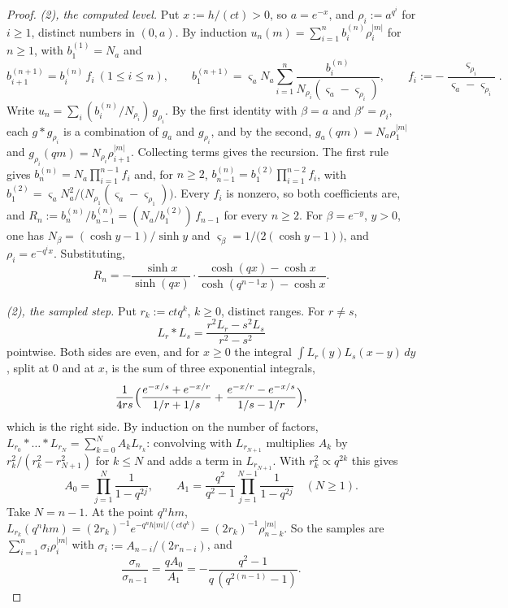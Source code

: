 \begin{proof}
\emph{(2), the computed level.} Put $x := h/(ct) > 0$, so $a = e^{-x}$, and $\rho_i := a^{q^i}$ for
$i \ge 1$, distinct numbers in $(0, a)$. By induction $u_n(m) = \sum_{i=1}^nb^{(n)}_i\rho_i^{|m|}$
for $n \ge 1$, with $b^{(1)}_1 = N_a$ and
\[
  b^{(n+1)}_{i+1} = b^{(n)}_i\,f_i \ (1 \le i \le n), \qquad
  b^{(n+1)}_1 = \varsigma_aN_a\sum_{i=1}^n\frac{b^{(n)}_i}{N_{\rho_i}(\varsigma_a - \varsigma_{\rho_i})},
  \qquad f_i := -\frac{\varsigma_{\rho_i}}{\varsigma_a - \varsigma_{\rho_i}} .
\]
Write $u_n = \sum_i(b^{(n)}_i/N_{\rho_i})\,g_{\rho_i}$. By the first identity with $\beta = a$ and
$\beta' = \rho_i$, each $g * g_{\rho_i}$ is a combination of $g_a$ and $g_{\rho_i}$, and by the
second, $g_a(qm) = N_a\rho_1^{|m|}$ and $g_{\rho_i}(qm) = N_{\rho_i}\rho_{i+1}^{|m|}$. Collecting
terms gives the recursion. The first rule gives $b^{(n)}_n = N_a\prod_{i=1}^{n-1}f_i$ and, for
$n \ge 2$, $b^{(n)}_{n-1} = b^{(2)}_1\prod_{i=1}^{n-2}f_i$, with
$b^{(2)}_1 = \varsigma_aN_a^2/\bigl(N_{\rho_1}(\varsigma_a - \varsigma_{\rho_1})\bigr)$. Every $f_i$
is nonzero, so both coefficients are, and
$R_n := b^{(n)}_n/b^{(n)}_{n-1} = (N_a/b^{(2)}_1)\,f_{n-1}$ for every $n \ge 2$. For
$\beta = e^{-y}$, $y > 0$, one has $N_\beta = (\cosh y - 1)/\sinh y$ and
$\varsigma_\beta = 1/\bigl(2(\cosh y - 1)\bigr)$, and $\rho_i = e^{-q^ix}$. Substituting,
\[
  R_n = -\frac{\sinh x}{\sinh(qx)}\cdot\frac{\cosh(qx) - \cosh x}{\cosh(q^{n-1}x) - \cosh x} .
\]

\emph{(2), the sampled step.} Put $r_k := ctq^k$, $k \ge 0$, distinct ranges. For $r \ne s$,
\[
  L_r * L_s = \frac{r^2L_r - s^2L_s}{r^2 - s^2}
\]
pointwise. Both sides are even, and for $x \ge 0$ the integral
$\int L_r(y)L_s(x - y)\,dy$, split at $0$ and at $x$, is the sum of three exponential integrals,
\[
  \frac{1}{4rs}\Bigl(\frac{e^{-x/s} + e^{-x/r}}{1/r + 1/s} + \frac{e^{-x/r} - e^{-x/s}}{1/s - 1/r}\Bigr),
\]
which is the right side. By induction on the number of factors,
$L_{r_0} * \dots * L_{r_N} = \sum_{k=0}^NA_kL_{r_k}$: convolving with $L_{r_{N+1}}$ multiplies
$A_k$ by $r_k^2/(r_k^2 - r_{N+1}^2)$ for $k \le N$ and adds a term in $L_{r_{N+1}}$. With
$r_k^2 \propto q^{2k}$ this gives
\[
  A_0 = \prod_{j=1}^{N}\frac{1}{1 - q^{2j}}, \qquad
  A_1 = \frac{q^2}{q^2 - 1}\prod_{j=1}^{N-1}\frac{1}{1 - q^{2j}} \quad (N \ge 1) .
\]
Take $N = n - 1$. At the point $q^nhm$,
$L_{r_k}(q^nhm) = (2r_k)^{-1}e^{-q^nh|m|/(ctq^k)} = (2r_k)^{-1}\rho_{n-k}^{|m|}$. So the samples are
$\sum_{i=1}^n\sigma_i\rho_i^{|m|}$ with $\sigma_i := A_{n-i}/(2r_{n-i})$, and
\[
  \frac{\sigma_n}{\sigma_{n-1}} = \frac{qA_0}{A_1} = -\frac{q^2 - 1}{q\,(q^{2(n-1)} - 1)} .
\]


\end{proof}
